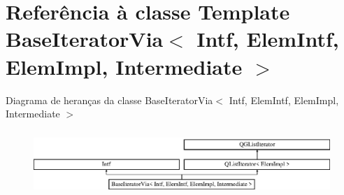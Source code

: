 \hypertarget{class_base_iterator_via}{\section{Referência à classe Template Base\-Iterator\-Via$<$ Intf, Elem\-Intf, Elem\-Impl, Intermediate $>$}
\label{class_base_iterator_via}
}
Diagrama de heranças da classe Base\-Iterator\-Via$<$ Intf, Elem\-Intf, Elem\-Impl, Intermediate $>$\begin{figure}[H]
\begin{center}
\leavevmode
\includegraphics[height=2.500000cm]{class_base_iterator_via}
\end{center}
\end{figure}
